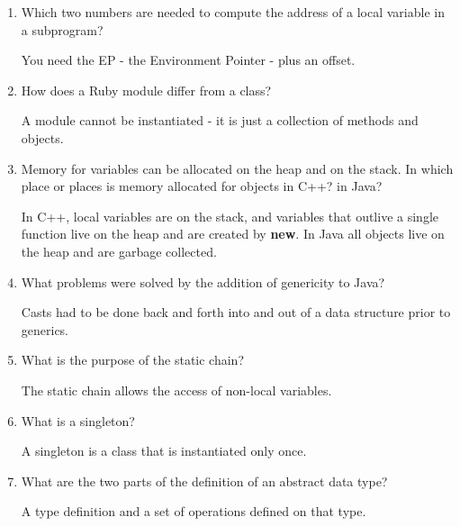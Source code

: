 \begin{enumerate}
  \item Which two numbers are needed to compute
    the address of a local variable in a subprogram?

  \begin{answer}
    You need the EP - the Environment Pointer - plus an offset.
    \end{answer}

  \item How does a Ruby module differ from a class?

  \begin{answer}
    A module cannot be instantiated - it is just a collection of methods and objects.
    \end{answer}

  \item Memory for variables can be allocated on the heap
    and on the stack. In which place or places is memory
    allocated for objects in C++? in Java?

  \begin{answer}
    In C++, local variables are on the stack, and variables that outlive a single
    function live on the heap and are created by \textbf{new}.
    In Java all objects live on the heap and are garbage collected.
    \end{answer}

  \item What problems were solved by the addition
    of genericity to Java?

  \begin{answer}
    Casts had to be done back and forth into and out of a data structure prior to 
    generics.
    \end{answer}

  \item What is the purpose of the static chain?

  \begin{answer}
    The static chain allows the access of non-local variables.
    \end{answer}

  \item What is a singleton?

  \begin{answer}
    A singleton is a class that is instantiated only once.
    \end{answer}

  \item What are the two parts of the definition 
    of an abstract data type?

  \begin{answer}
    A type definition and a set of operations defined on that type.
    \end{answer}

  \end{enumerate}


